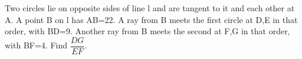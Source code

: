 Two circles lie on opposite sides of line l and are tangent to it and each other at A. A point B on l has AB=22. A ray from B meets the first circle at D,E in that order, with BD=9. Another ray from B meets the second at F,G in that order, with BF=4. Find $\dfrac{DG}{EF}$.
